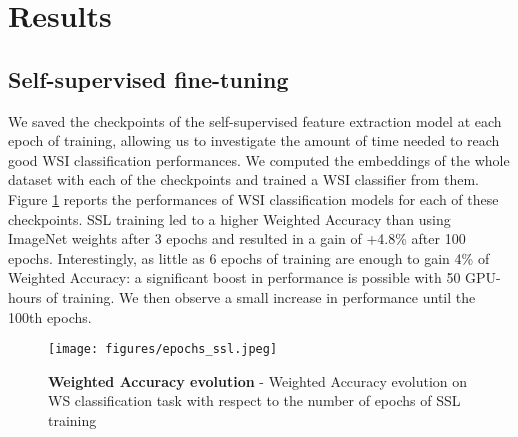 \section{Results}

\subsection{Self-supervised fine-tuning}

We saved the checkpoints of the self-supervised feature extraction model at each epoch of training, allowing us to investigate the amount of time needed to reach good WSI classification performances. We computed the embeddings of the whole dataset with each of the checkpoints and trained a WSI classifier from them. Figure \ref{fig:ssl_epochs} reports the performances of WSI classification models for each of these checkpoints.
SSL training led to a higher Weighted Accuracy than using ImageNet weights after 3 epochs and resulted in a gain of  +4.8\% after 100 epochs.
Interestingly, as little as 6 epochs of training are enough to gain 4\% of Weighted Accuracy: a significant boost in performance is possible with 50 GPU-hours of training.
We then observe a small increase in performance until the 100th epochs.


\begin{figure}[h]
\centering
\texttt{[image: figures/epochs\_ssl.jpeg]}
\caption{\textbf{Weighted Accuracy evolution} - Weighted Accuracy evolution on WS classification task with respect to the number of epochs of SSL training}
\label{fig:ssl_epochs}
\end{figure}



